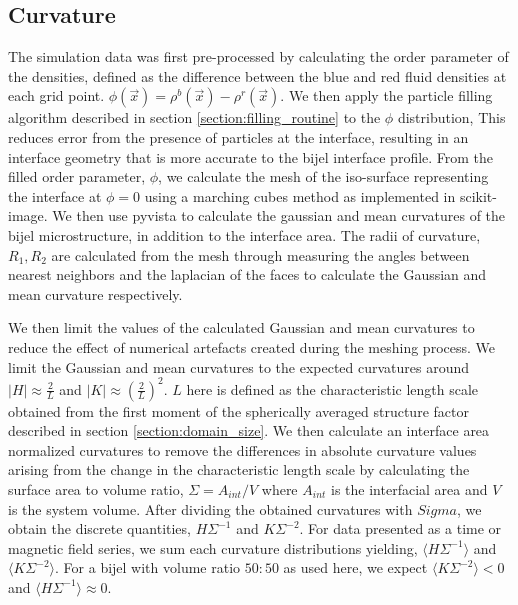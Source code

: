 \subsection{Curvature}
\label{section:curvature}

The simulation data was first pre-processed by calculating the order parameter of the densities, defined as the difference between the blue and red 
fluid densities at each grid point. $\phi(\vec{x}) = \rho^b(\vec{x}) - \rho^r(\vec{x})$. We then apply the particle filling algorithm described in 
section \ref{section:filling_routine} to the $\phi$ distribution, This reduces error from the presence of particles at the interface, 
resulting in an interface geometry that is more accurate to the bijel interface profile. From the filled order parameter, $\phi$, we calculate the mesh of 
the iso-surface representing the interface at $\phi = 0$ using a marching cubes method as implemented in scikit-image. We then use pyvista to calculate the 
gaussian and mean curvatures of the bijel microstructure, in addition to the interface area. The radii of curvature, $R_1, R_2$ are calculated from the 
mesh through measuring the angles between nearest neighbors and the laplacian of the faces to calculate the Gaussian and mean curvature respectively. 

We then limit the values of the calculated Gaussian and mean curvatures to reduce the effect of numerical artefacts created during the meshing process. We 
limit the Gaussian and mean curvatures to the expected curvatures around $|H| \approx \frac{2}{L}$ and $|K| \approx (\frac{2}{L})^2$. $L$ here is defined 
as the characteristic length scale obtained from the first moment of the spherically averaged structure factor described in section \ref{section:domain_size}.  
We then calculate an interface area normalized curvatures to remove the differences in absolute curvature values arising from the change in the characteristic 
length scale by calculating the surface area to volume ratio, $\Sigma = A_{int}/V$ where $A_{int}$ is the interfacial area and $V$ is the system volume. After 
dividing the obtained curvatures with $Sigma$, we obtain the discrete quantities, $H \Sigma^{-1}$ and $K \Sigma^{-2}$. For data presented as a time or magnetic 
field series, we sum each curvature distributions yielding, $\langle H \Sigma^{-1} \rangle$ and $\langle K \Sigma^{-2} \rangle$. For a bijel with volume ratio 
$50:50$ as used here, we expect $\langle K \Sigma^{-2} \rangle < 0$ and $\langle H \Sigma^{-1} \rangle \approx 0$.

